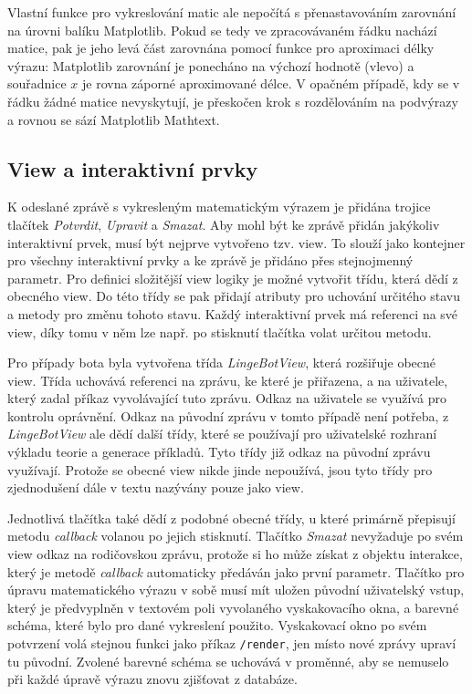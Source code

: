 \documentclass[FM]{tulthesis}
\begin{document}
	Vlastní funkce pro vykreslování matic ale nepočítá s přenastavováním zarovnání na úrovni balíku Matplotlib. Pokud se tedy ve zpracovávaném řádku nachází matice, pak je jeho levá část zarovnána pomocí funkce pro aproximaci délky výrazu: Matplotlib zarovnání je ponecháno na výchozí hodnotě (vlevo) a souřadnice $x$ je rovna záporné aproximované délce. V opačném případě, kdy se v řádku žádné \mbox{matice} nevyskytují, je přeskočen krok s rozdělováním na podvýrazy a rovnou se sází Matplotlib Mathtext.
	
	\subsection{View a interaktivní prvky}
	
	K odeslané zprávě s vykresleným matematickým výrazem je přidána trojice tlačítek \textit{Potvrdit}, \textit{Upravit} a \textit{Smazat}. Aby mohl být ke zprávě přidán jakýkoliv interaktivní prvek, musí být nejprve vytvořeno tzv. view. To slouží jako kontejner pro všechny interaktivní prvky a ke zprávě je přidáno přes stejnojmenný parametr. Pro definici složitější view logiky je možné vytvořit třídu, která dědí z obecného view. Do této třídy se pak přidají atributy pro uchování určitého stavu a metody pro změnu tohoto stavu. Každý interaktivní prvek má referenci na své view, díky tomu v něm lze např. po stisknutí tlačítka volat určitou metodu.
	
	Pro případy bota byla vytvořena třída \textit{LingeBotView}, která rozšiřuje obecné view. Třída uchovává referenci na zprávu, ke které je přiřazena, a na uživatele, který zadal příkaz vyvolávající tuto zprávu. Odkaz na uživatele se využívá pro kontrolu oprávnění. Odkaz na původní zprávu v tomto případě není potřeba, z \mbox{\textit{LingeBotView}} ale dědí další třídy, které se používají pro uživatelské rozhraní výkladu teorie a generace příkladů. Tyto třídy již odkaz na původní zprávu využívají. Protože se obecné view nikde jinde nepoužívá, jsou tyto třídy pro zjednodušení dále v textu nazývány pouze jako view. 
	
	Jednotlivá tlačítka také dědí z podobné obecné třídy, u které primárně přepisují metodu \textit{callback} volanou po jejich stisknutí. Tlačítko \textit{Smazat} nevyžaduje po svém view odkaz na rodičovskou zprávu, protože si ho může získat z objektu interakce, který je metodě \textit{callback} automaticky předáván jako první parametr. Tlačítko pro úpravu matematického výrazu v sobě musí mít uložen původní uživatelský vstup, který je předvyplněn v textovém poli vyvolaného vyskakovacího okna, a barevné schéma, které bylo pro dané vykreslení použito. Vyskakovací okno po svém potvrzení volá stejnou funkci jako příkaz \verb|/render|, jen místo nové zprávy upraví tu původní. Zvolené barevné schéma se uchovává v proměnné, aby se nemuselo při každé úpravě výrazu znovu zjišťovat z databáze.
		
\end{document}
